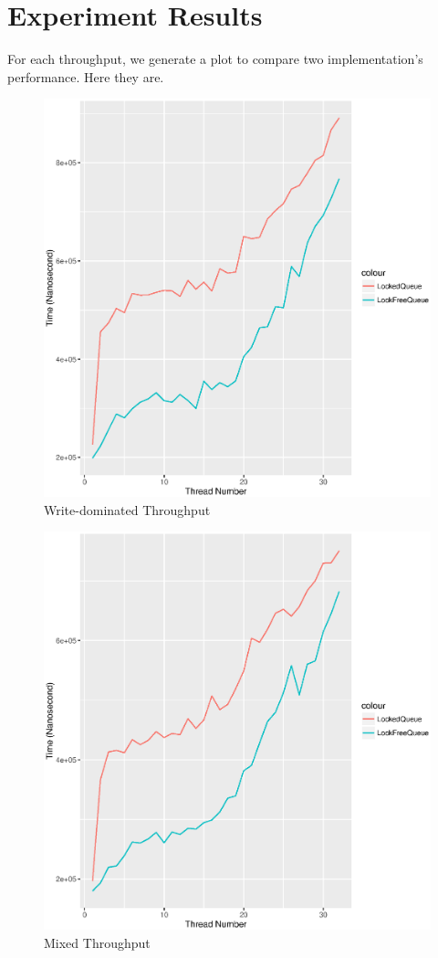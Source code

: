 \documentclass[a4paper]{report}
\begin{document}
\section*{Experiment Results}
For each throughput, we generate a plot to compare two implementation's performance. Here they are.

\begin{figure}[H]
  \includegraphics[scale=0.8]{result/result-tacc-7858356-write}
  \caption{Write-dominated Throughput}
\end{figure}

\begin{figure}[H]
  \includegraphics[scale=0.8]{result/result-tacc-7858356-mixed}
  \caption{Mixed Throughput}
\end{figure}
\end{document}
